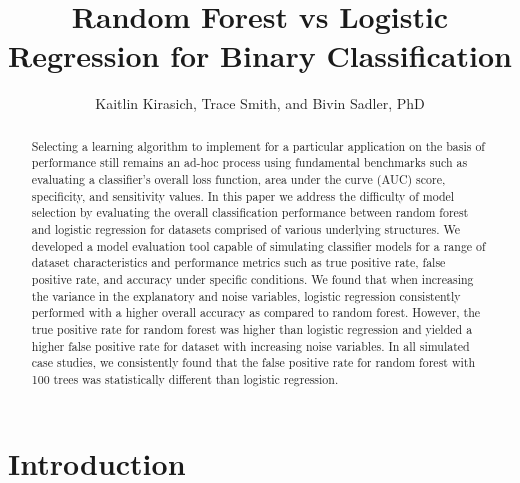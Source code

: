 \documentclass{llncs}
\title{\textbf{Random Forest vs Logistic Regression for Binary Classification}}
\author{Kaitlin Kirasich, Trace Smith, and Bivin Sadler, PhD}
\institute{Master of Science in Data Science \\ Southern Methodist University \\ Dallas, Texas USA \\
\email{kkirasich@smu.edu,traces@smu.edu,bsadler@smu.edu}}
\begin{document}
\maketitle

\begin{abstract} 
Selecting a learning algorithm to implement for a particular application on the basis of performance still remains an ad-hoc process using fundamental benchmarks such as evaluating a classifier’s overall loss function, area under the curve (AUC) score, specificity, and sensitivity values. In this paper we address the difficulty of model selection by evaluating the overall classification performance between random forest and logistic regression for datasets comprised of various underlying structures. We developed a model evaluation tool capable of simulating classifier models for a range of dataset characteristics and performance metrics such as true positive rate, false positive rate, and accuracy under specific conditions. We found that when increasing the variance in the explanatory and noise variables, logistic regression consistently performed with a higher overall accuracy as compared to random forest. However, the true positive rate for random forest was higher than logistic regression and yielded a higher false positive rate for dataset with increasing noise variables. In all simulated case studies, we consistently found that the false positive rate for random forest with 100 trees was statistically different than logistic regression. 

\end{abstract}


\section{Introduction}
\end{document}
